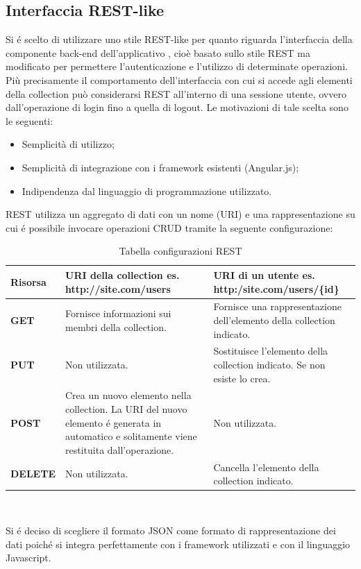 \subsection{Interfaccia REST-like}
Si é scelto di utilizzare uno stile REST-like per quanto riguarda l'interfaccia della componente back-end dell'applicativo \PROGETTO, cioè basato sullo stile REST ma modificato per permettere l'autenticazione e l'utilizzo di determinate operazioni. Più precisamente il comportamento dell'interfaccia con cui si accede agli elementi della collection può considerarsi REST all'interno di una sessione utente, ovvero dall'operazione di login fino a quella di logout. Le motivazioni di tale scelta sono le seguenti:
\begin{itemize}
	\item Semplicità di utilizzo;
	\item Semplicità di integrazione con i framework esistenti (Angular.js);
	\item Indipendenza dal linguaggio di programmazione utilizzato.
	\end{itemize}
	REST utilizza un aggregato di dati con un nome (URI) e una rappresentazione su cui é possibile invocare operazioni CRUD tramite la seguente configurazione:
	
	\begin{table}[h]
		\begin{tabular}{|p{}|p{}|p{}|}
			\toprule
			
			\textbf{Risorsa} & \textbf{URI della collection} \smallbreak
			es. http://site.com/users  & \textbf{URI di un utente} \smallbreak
			es. http:/site.com/users/\{id\} \\
			
			\midrule
			\textbf{GET} & Fornisce informazioni sui membri della collection. & Fornisce una rappresentazione dell'elemento della collection indicato. \\ \midrule
			\textbf{PUT} & Non utilizzata. & Sostituisce l'elemento della collection indicato. Se non esiste lo crea. \\  \midrule
			\textbf{POST} & Crea un nuovo elemento nella collection. La URI del nuovo elemento é generata in automatico e solitamente viene restituita dall'operazione. & Non utilizzata. \\ \midrule
			\textbf{DELETE} & Non utilizzata. & Cancella l'elemento della collection indicato.  \\ \midrule
			
			
			\end{tabular}\\
			\caption{Tabella configurazioni REST}
			
			\end{table}
			
Si é deciso di scegliere il formato JSON come formato di rappresentazione dei dati poiché si integra perfettamente con i framework utilizzati e con il linguaggio Javascript.